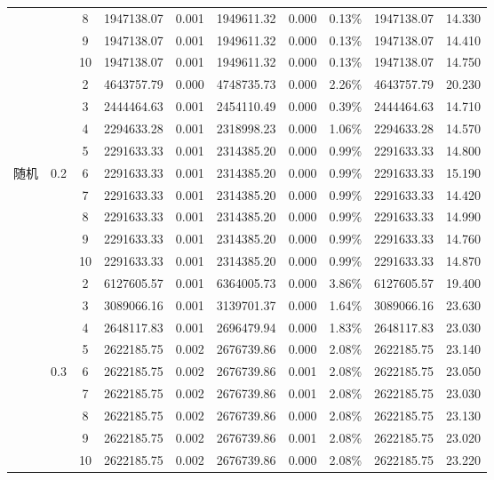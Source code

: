{\begin{longtable}{cccrcrrcrr}
		&       & 8     & 1947138.07 & 0.001 & 1949611.32 & 0.000 & 0.13\% & 1947138.07 & 14.330 \\
		&       & 9     & 1947138.07 & 0.001 & 1949611.32 & 0.000 & 0.13\% & 1947138.07 & 14.410 \\
		&       & 10    & 1947138.07 & 0.001 & 1949611.32 & 0.000 & 0.13\% & 1947138.07 & 14.750 \\
		&       & 2     & 4643757.79 & 0.000 & 4748735.73 & 0.000 & 2.26\% & 4643757.79 & 20.230 \\
		&       & 3     & 2444464.63 & 0.001 & 2454110.49 & 0.000 & 0.39\% & 2444464.63 & 14.710 \\
		&       & 4     & 2294633.28 & 0.001 & 2318998.23 & 0.000 & 1.06\% & 2294633.28 & 14.570 \\
		&       & 5     & 2291633.33 & 0.001 & 2314385.20 & 0.000 & 0.99\% & 2291633.33 & 14.800 \\
	\multicolumn{1}{l}{随机} & 0.2   & 6     & 2291633.33 & 0.001 & 2314385.20 & 0.000 & 0.99\% & 2291633.33 & 15.190 \\
		&       & 7     & 2291633.33 & 0.001 & 2314385.20 & 0.000 & 0.99\% & 2291633.33 & 14.420 \\
		&       & 8     & 2291633.33 & 0.001 & 2314385.20 & 0.000 & 0.99\% & 2291633.33 & 14.990 \\
		&       & 9     & 2291633.33 & 0.001 & 2314385.20 & 0.000 & 0.99\% & 2291633.33 & 14.760 \\
		&       & 10    & 2291633.33 & 0.001 & 2314385.20 & 0.000 & 0.99\% & 2291633.33 & 14.870 \\
		&       & 2     & 6127605.57 & 0.001 & 6364005.73 & 0.000 & 3.86\% & 6127605.57 & 19.400 \\
		&       & 3     & 3089066.16 & 0.001 & 3139701.37 & 0.000 & 1.64\% & 3089066.16 & 23.630 \\
		&       & 4     & 2648117.83 & 0.001 & 2696479.94 & 0.000 & 1.83\% & 2648117.83 & 23.030 \\
		&       & 5     & 2622185.75 & 0.002 & 2676739.86 & 0.000 & 2.08\% & 2622185.75 & 23.140 \\
		& 0.3   & 6     & 2622185.75 & 0.002 & 2676739.86 & 0.001 & 2.08\% & 2622185.75 & 23.050 \\
		&       & 7     & 2622185.75 & 0.002 & 2676739.86 & 0.001 & 2.08\% & 2622185.75 & 23.030 \\
		&       & 8     & 2622185.75 & 0.002 & 2676739.86 & 0.000 & 2.08\% & 2622185.75 & 23.130 \\
		&       & 9     & 2622185.75 & 0.002 & 2676739.86 & 0.001 & 2.08\% & 2622185.75 & 23.020 \\
		&       & 10    & 2622185.75 & 0.002 & 2676739.86 & 0.000 & 2.08\% & 2622185.75 & 23.220 \\
	\bottomrule %
\end{longtable}
}

